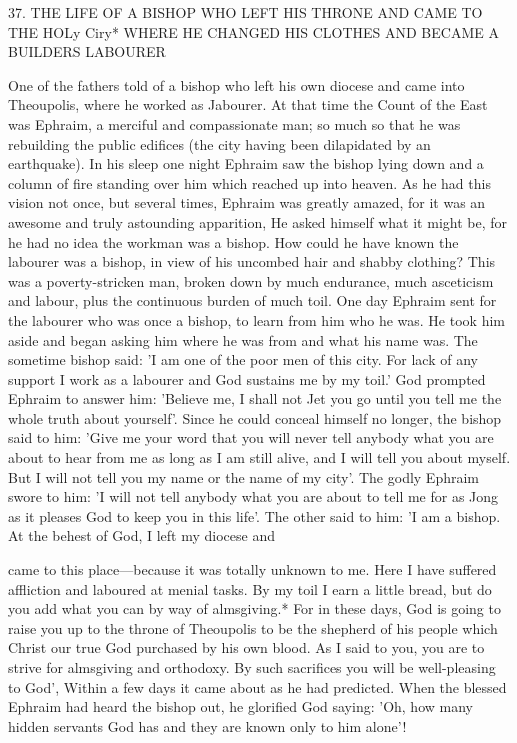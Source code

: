 37.
THE LIFE OF A BISHOP WHO LEFT
HIS THRONE AND CAME TO THE HOLy Ciry*
WHERE HE CHANGED HIS CLOTHES AND
BECAME A BUILDER\textquotesingle S LABOURER

One of the fathers told of a bishop who left his own diocese and
came into Theoupolis, where he worked as Jabourer.
At that time
the Count of the East was Ephraim, a merciful and compassionate
man; so much so that he was rebuilding the public edifices (the city
having been dilapidated by an earthquake).
In his sleep one night
Ephraim saw the bishop lying down and a column of fire standing
over him which reached up into heaven.
As he had this vision not
once, but several times, Ephraim was greatly amazed, for it was an
awesome and truly astounding apparition, He asked himself what
it might be, for he had no idea the workman was a bishop.
How
could he have known the labourer was a bishop, in view of his
uncombed hair and shabby clothing? This was a poverty-stricken
man, broken down by much endurance, much asceticism and
labour, plus the continuous burden of much toil.
One day Ephraim
sent for the labourer who was once a bishop, to learn from him who
he was.
He took him aside and began asking him where he was
from and what his name was.
The sometime bishop said: 'I am one
of the poor men of this city.
For lack of any support I work as a
labourer and God sustains me by my toil.' God prompted Ephraim
to answer him: 'Believe me, I shall not Jet you go until you tell me
the whole truth about yourself'.
Since he could conceal himself no
longer, the bishop said to him: 'Give me your word that you will
never tell anybody what you are about to hear from me as long as
I am still alive, and I will tell you about myself.
But I will not tell
you my name or the name of my city'.
The godly Ephraim swore to
him: 'I will not tell anybody what you are about to tell me for as
Jong as it pleases God to keep you in this life'.
The other said to
him: 'I am a bishop.
At the behest of God, I left my diocese and

came to this place—because it was totally unknown to me.
Here I
have suffered affliction and laboured at menial tasks.
By my toil I
earn a little bread, but do you add what you can by way of
almsgiving.* For in these days, God is going to raise you up to the
throne of Theoupolis to be the shepherd of his people which Christ
our true God purchased by his own blood.
As I said to you, you are
to strive for almsgiving and orthodoxy.
By such sacrifices you will
be well-pleasing to God', Within a few days it came about as he had
predicted.
When the blessed Ephraim had heard the bishop out, he
glorified God saying: 'Oh, how many hidden servants God has and
they are known only to him alone'!

